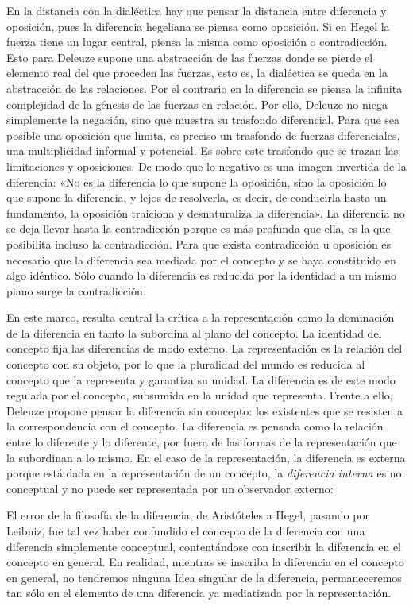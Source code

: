 En la distancia con la dialéctica hay que pensar la distancia entre diferencia y oposición, pues la diferencia hegeliana se piensa como oposición. Si en Hegel la fuerza tiene un lugar central, piensa la misma como oposición o contradicción. Esto para Deleuze supone una abstracción de las fuerzas donde se pierde el elemento real del que proceden las fuerzas, esto es, la dialéctica se queda en la abstracción de las relaciones. Por el contrario en la diferencia se piensa la infinita complejidad de la génesis de las fuerzas en relación. Por ello, Deleuze no niega simplemente la negación, sino que muestra su trasfondo diferencial. Para que sea posible una oposición que limita, es preciso un trasfondo de fuerzas diferenciales, una multiplicidad informal y potencial. Es sobre este trasfondo que se trazan las limitaciones y oposiciones. De modo que lo negativo es una imagen invertida de la diferencia: «No es la diferencia lo que supone la oposición, sino la oposición lo que supone la diferencia, y lejos de resolverla, es decir, de conducirla hasta un fundamento, la oposición traiciona y desnaturaliza la diferencia». La diferencia no se deja llevar hasta la contradicción porque es más profunda que ella, es la que posibilita incluso la contradicción. Para que exista contradicción u oposición es necesario que la diferencia sea mediada por el concepto y se haya constituido en algo idéntico. Sólo cuando la diferencia es reducida por la identidad a un mismo plano surge la contradicción.

En este marco, resulta central la crítica a la representación como la dominación de la diferencia en tanto la subordina al plano del concepto. La identidad del concepto fija las diferencias de modo externo. La representación es la relación del concepto con su objeto, por lo que la pluralidad del mundo es reducida al concepto que la representa y garantiza su unidad. La diferencia es de este modo regulada por el concepto, subsumida en la unidad que representa. Frente a ello, Deleuze propone pensar la diferencia sin concepto: los existentes que se resisten a la correspondencia con el concepto. La diferencia es pensada como la relación entre lo diferente y lo diferente, por fuera de las formas de la representación que la subordinan a lo mismo. En el caso de la representación, la diferencia es externa porque está dada en la representación de un concepto, la \emph{diferencia interna} es no conceptual y no puede ser representada por un observador externo:

El error de la filosofía de la diferencia, de Aristóteles a Hegel, pasando por Leibniz, fue tal vez haber confundido el concepto de la diferencia con una diferencia simplemente conceptual, contentándose con inscribir la diferencia en el concepto en general. En realidad, mientras se inscriba la diferencia en el concepto en general, no tendremos ninguna Idea singular de la diferencia, permaneceremos tan sólo en el elemento de una diferencia ya mediatizada por la representación.

